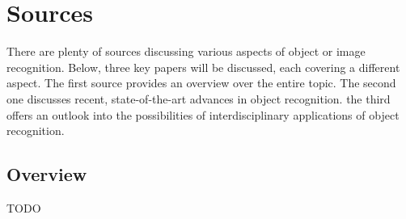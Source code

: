 \documentclass[twoside,a4paper]{article}
\title{\papertitle}
\affiliation{
\paperauthorA}
{\href{http://www.haw-hamburg.de/ti-i}{Hamburg University of Applied Sciences,
    Dept. Computer Science,} \\ Berliner Tor 7\\ 20099 Hamburg, Germany\\
{\ttfamily \href{mailto:lotte.steenbrink@haw-hamburg.de}{lotte.steenbrink@haw-hamburg.de}}
}
\newif\ifpdf
\begin{document}
\ifpdf %
  \DeclareGraphicsExtensions{.png,.jpg,.pdf}
\else  %
\fi

\maketitle

\begin{abstract}
Recognizing an categorizing objects in an image is one of the problems which are harder to solve for computers than for humans. However, image recognition is imperative to make human-computer interaction more natural and improve the way information contained in images is stored and handled. In recent years, the field has seen a lot of progress. My homework would aim to provide an overview over the challenges faced by image recognition software, and available solutions as well as their limitations.
\end{abstract}


\section{Sources}
\label{sec:src}
There are plenty of sources discussing various aspects of object or image recognition. Below, three key papers will be discussed, each covering a different aspect. The first source provides an overview over the entire topic. The second one discusses recent, state-of-the-art advances in object recognition. the third offers an outlook into the possibilities of interdisciplinary applications of object recognition.

\subsection{Overview}
\label{sec:subsec_overview}
TODO
\end{document}
